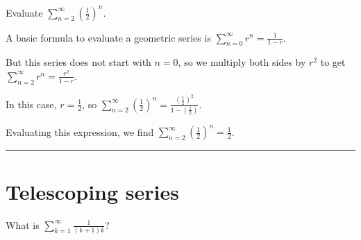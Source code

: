 \documentclass{ximera}
\begin{document}
\begin{question}
  Evaluate \(\displaystyle\sum_{n=2}^\infty \left(\displaystyle\frac{1}{2}\right)^{n}\).

  \begin{solution}
    \begin{hint}
      A basic formula to evaluate a geometric series is \(\displaystyle\sum_{n=0}^\infty r^{n} = \displaystyle\frac{1}{1-r}\).
    \end{hint}
    \begin{hint}
      But this series does not start with \(n=0\), so we multiply both sides by \(r^{2}\) to get  \(\displaystyle\sum_{n=2}^\infty r^{n} = \displaystyle\frac{r^{2}}{1-r}\).
    \end{hint}
    \begin{hint}
      In this case, \(r = \displaystyle\frac{1}{2}\), so \(\displaystyle\sum_{n=2}^\infty \left( \displaystyle\frac{1}{2} \right)^{n} = \displaystyle\frac{\left( \displaystyle\frac{1}{2} \right)^{2}}{1-\left(\displaystyle\frac{1}{2}\right)}\).
    \end{hint}
    \begin{hint}
      Evaluating this expression, we find \(\displaystyle\sum_{n=2}^\infty \left( \displaystyle\frac{1}{2} \right)^{n} = \displaystyle\frac{1}{2}\).
    \end{hint}


    \begin{multiple-choice}
      
    \end{multiple-choice}
    
  \end{solution}
\end{question}

\hrule

\section{Telescoping series}

What is $\displaystyle\sum_{k=1}^\infty \frac{1}{(k+1)k}$?

\end{document}
